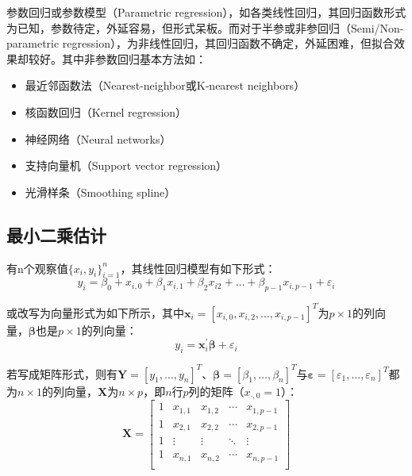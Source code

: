 \documentclass[11pt]{article}
\begin{document}
参数回归或参数模型（Parametric regression），如各类线性回归，其回归函数形式为已知，参数待定，外延容易，但形式呆板。而对于半参或非参回归（Semi/Non-parametric regression），为非线性回归，其回归函数不确定，外延困难，但拟合效果却较好。其中非参数回归基本方法如：
\begin{itemize}
    \item 最近邻函数法（Nearest-neighbor或K-nearest neighbors）
    \item 核函数回归（Kernel regression）
    \item 神经网络（Neural networks）
    \item 支持向量机（Support vector regression）
    \item 光滑样条（Smoothing spline）
\end{itemize}

\subsection{最小二乘估计}

有n个观察值$\{x_i,y_i\}_{i=1}^{n}$，其线性回归模型有如下形式：
\begin{equation*}
    y_i = \beta_0 + x_{i,0} + \beta_1 x_{i,1} + \beta_2 x_{i2} + \dots + \beta_{p-1} x_{i,p-1} + \varepsilon_{i}
\end{equation*}

或改写为向量形式为如下所示，其中$\bm{x}_i = [x_{i,0},x_{i,2},\dots,x_{i,p-1}]^{T}$为$p\times 1$的列向量，$\bm{\beta}$也是$p \times 1$的列向量：
\begin{equation*}
    y_i = \bm{x}_{i}^{'} \bm{\beta} + \varepsilon_i
\end{equation*}

若写成矩阵形式，则有$\bm{Y}=[y_1,\dots,y_n]^{T}$、$\bm{\beta}=[\beta_1,\dots,\beta_n]^{T}$与$\bm{\varepsilon}=[\varepsilon_1,\dots,\varepsilon_n]^{T}$都为$n\times 1$的列向量，$\bm{X}$为$n\times p$，即$n$行$p$列的矩阵（$x_{\cdot,0}=1$）：
\begin{equation*}
    \bm{X} =
    \begin{bmatrix}
        1 & x_{1,1} & x_{1,2} & \cdots & x_{1,p-1} \\
        1 & x_{2,1} & x_{2,2} & \cdots & x_{2,p-1} \\
        1 & \vdots  & \vdots  & \ddots & \vdots    \\
        1 & x_{n,1} & x_{n,2} & \cdots & x_{n,p-1} \\
    \end{bmatrix}
\end{equation*}
\end{document}
